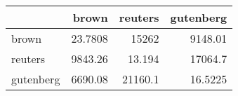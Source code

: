 \begin{tabular}{lrrr}
\hline
           &     brown &   reuters &   gutenberg \\
\hline
 brown     &   23.7808 & 15262     &   9148.01   \\
 reuters   & 9843.26   &    13.194 &  17064.7    \\
 gutenberg & 6690.08   & 21160.1   &     16.5225 \\
\hline
\end{tabular}